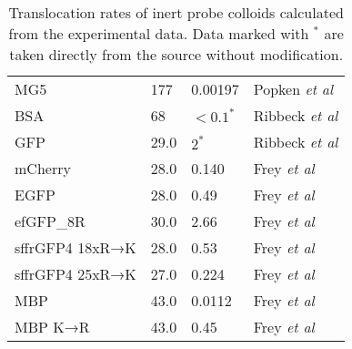 \documentclass[10pt, a4paper]{article}
\begin{document}
\begin{multicols}{2}
\begin{table}[H]
{\begin{tabular}{p{3cm}|p{1cm}|p{2cm}|p{2.6cm}}
MG5 & 177 & 0.00197 & Popken \textit{et al} \\
BSA & 68 & $<0.1^{*}$ & Ribbeck \textit{et al} \\
GFP & 29.0 & $2^{*}$ & Ribbeck \textit{et al} \\
mCherry & 28.0 & 0.140 & Frey \textit{et al} \\
EGFP & 28.0 & 0.49 & Frey \textit{et al} \\
efGFP\_8R & 30.0 & 2.66 & Frey \textit{et al} \\
sffrGFP4 18xR→K & 28.0 & 0.53 & Frey \textit{et al} \\
sffrGFP4 25xR→K & 27.0 & 0.224 & Frey \textit{et al} \\
MBP & 43.0 & 0.0112 & Frey \textit{et al} \\
MBP K→R & 43.0 & 0.45 & Frey \textit{et al} \\
\end{tabular}
}
\caption{Translocation rates of inert probe colloids calculated from the experimental data.
Data marked with $^{*}$ are taken directly from the source without modification.}
\label{tbl:inert_probes}
\end{table}


\end{multicols}
\end{document}

